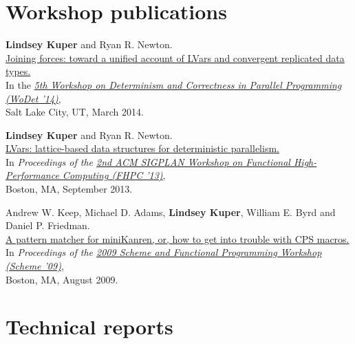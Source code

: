 \documentclass[10pt,letterpaper]{article}
\newenvironment{itemize*}
  {\begin{itemize}
      \setlength{\itemsep}{1pt}
      \setlength{\parskip}{3pt}
  }
  {\end{itemize}}
\begin{document}
\section*{Workshop publications}
\begin{itemize*}
\item
  \textbf{Lindsey Kuper} and Ryan R. Newton. \\
  \href{http://www.cs.indiana.edu/~lkuper/papers/joining-wodet14.pdf}{Joining
    forces: toward a unified account of LVars and convergent
    replicated data types.} \\
  In the \emph{\href{http://wodet.cs.washington.edu/}{5th Workshop on
      Determinism and Correctness in Parallel Programming (WoDet
      '14)}}, \\
  Salt Lake City, UT, March 2014.

\item
  \textbf{Lindsey Kuper} and Ryan R. Newton. \\
  \href{http://www.cs.indiana.edu/~lkuper/papers/lvars-fhpc13.pdf}{LVars:
    lattice-based data structures for deterministic parallelism.} \\
  In \emph{Proceedings of the
    \href{http://hiperfit.dk/fhpc13.html}{2nd ACM SIGPLAN Workshop on
      Functional High-Performance Computing (FHPC '13)}}, \\
  Boston, MA, September 2013.

\item
  Andrew W. Keep, Michael D. Adams, \textbf{Lindsey Kuper}, William
  E. Byrd and Daniel P. Friedman. \\
  \href{http://www.cs.indiana.edu/~lkuper/papers/lambdae.pdf}{A
    pattern matcher for miniKanren, or, how to get into trouble with
    CPS macros.}  \\
  In \emph{Proceedings of the
    \href{http://www.schemeworkshop.org/2009/}{2009 Scheme and
      Functional Programming Workshop (Scheme '09)}}, \\
  Boston, MA, August 2009.
\end{itemize*}

\section*{Technical reports}
\end{document}
